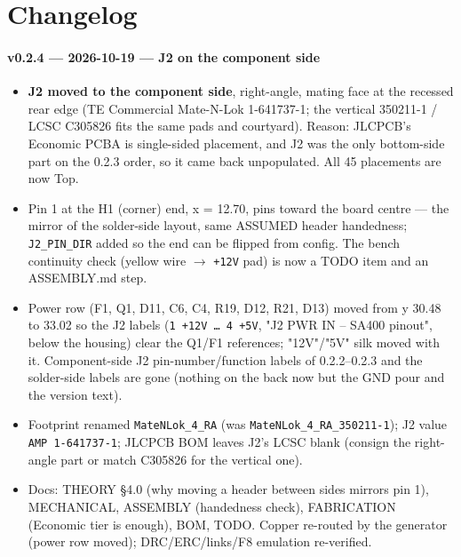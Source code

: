 \documentclass[11pt,a4paper]{article}
\begin{document}
\section{Changelog}
\paragraph{v0.2.4 — 2026-10-19 — J2 on the component side}
\begin{itemize}[leftmargin=8mm]
\item \textbf{J2 moved to the component side}, right-angle, mating face at the recessed rear edge (TE Commercial Mate-N-Lok 1-641737-1; the vertical 350211-1 / LCSC C305826 fits the same pads and courtyard). Reason: JLCPCB's Economic PCBA is single-sided placement, and J2 was the only bottom-side part on the 0.2.3 order, so it came back unpopulated. All 45 placements are now Top.
\item Pin 1 at the H1 (corner) end, x = 12.70, pins toward the board centre — the mirror of the solder-side layout, same ASSUMED header handedness; \texttt{J2\_PIN\_DIR} added so the end can be flipped from config. The bench continuity check (yellow wire $\to$ \texttt{+12V} pad) is now a TODO item and an ASSEMBLY.md step.
\item Power row (F1, Q1, D11, C6, C4, R19, D12, R21, D13) moved from y 30.48 to 33.02 so the J2 labels (\texttt{1 +12V … 4 +5V}, "J2 PWR IN – SA400 pinout", below the housing) clear the Q1/F1 references; "12V"/"5V" silk moved with it. Component-side J2 pin-number/function labels of 0.2.2–0.2.3 and the solder-side labels are gone (nothing on the back now but the GND pour and the version text).
\item Footprint renamed \texttt{MateNLok\_4\_RA} (was \texttt{MateNLok\_4\_RA\_350211-1}); J2 value \texttt{AMP 1-641737-1}; JLCPCB BOM leaves J2's LCSC blank (consign the right-angle part or match C305826 for the vertical one).
\item Docs: THEORY §4.0 (why moving a header between sides mirrors pin 1), MECHANICAL, ASSEMBLY (handedness check), FABRICATION (Economic tier is enough), BOM, TODO. Copper re-routed by the generator (power row moved); DRC/ERC/links/F8 emulation re-verified.

\end{itemize}
\end{document}
